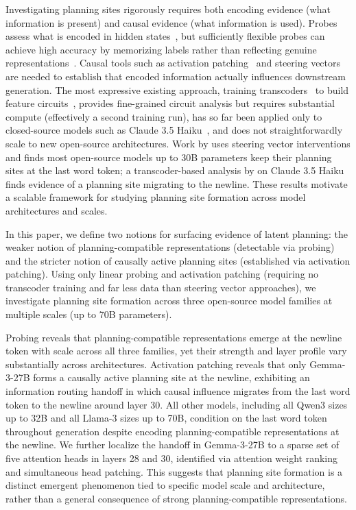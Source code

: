 \documentclass{article}
\begin{document}
Investigating planning sites rigorously requires both encoding evidence (what information is present) and causal evidence (what information is used). Probes assess what is encoded in hidden states~\citep{hewitt19,burns24}, but sufficiently flexible probes can achieve high accuracy by memorizing labels rather than reflecting genuine representations~\citep{hewitt19}. Causal tools such as activation patching~\citep{meng23,wang2022ioi} and steering vectors~\citep{turner2023activation,arditi2024refusal} are needed to establish that encoded information actually influences downstream generation. The most expressive existing approach, training transcoders~\citep{transcoders} to build feature circuits~\citep{sparsefeaturecircuits,ameisen2025circuittracing}, provides fine-grained circuit analysis but requires substantial compute (effectively a second training run), has so far been applied only to closed-source models such as Claude 3.5 Haiku~\citep{anthropic-bio}, and does not straightforwardly scale to new open-source architectures. Work by \citet{maar2026whatsplanmetricsimplicit} uses steering vector interventions and finds most open-source models up to 30B parameters keep their planning sites at the last word token; a transcoder-based analysis by \citet{anthropic-bio} on Claude 3.5 Haiku finds evidence of a planning site migrating to the newline. These results motivate a scalable framework for studying planning site formation across model architectures and scales.

In this paper, we define two notions for surfacing evidence of latent planning: the weaker notion of planning-compatible representations (detectable via probing) and the stricter notion of causally active planning sites (established via activation patching). Using only linear probing and activation patching (requiring no transcoder training and far less data than steering vector approaches), we investigate planning site formation across three open-source model families at multiple scales (up to 70B parameters).

Probing reveals that planning-compatible representations emerge at the newline token with scale across all three families, yet their strength and layer profile vary substantially across architectures. Activation patching reveals that only Gemma-3-27B forms a causally active planning site at the newline, exhibiting an information routing handoff in which causal influence migrates from the last word token to the newline around layer 30. All other models, including all Qwen3 sizes up to 32B and all Llama-3 sizes up to 70B, condition on the last word token throughout generation despite encoding planning-compatible representations at the newline. We further localize the handoff in Gemma-3-27B to a sparse set of five attention heads in layers 28 and 30, identified via attention weight ranking and simultaneous head patching. This suggests that planning site formation is a distinct emergent phenomenon tied to specific model scale and architecture, rather than a general consequence of strong planning-compatible representations.
\end{document}

